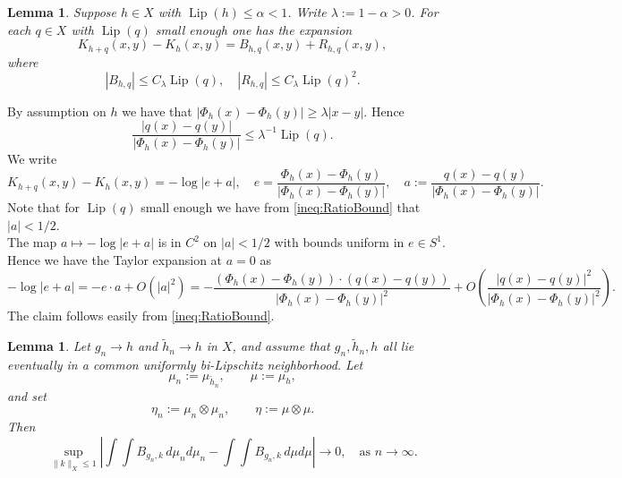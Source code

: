 \documentclass[11pt]{article}
\theoremstyle{plain}
\numberwithin{equation}{section}
\newtheorem{lemma}[theorem]{Lemma}
\theoremstyle{definition}
\let\oldendproof\endproof
\renewenvironment{proof}[1][\proofname]{%
\oldproof[\upshape \bfseries #1]%
}{\oldendproof}
\DeclareMathOperator{\Lip}{Lip}
\begin{document}
    \begin{lemma}
        \label{lem:KernelExpansion}
        Suppose $h \in X$ with $\Lip(h)\leq \alpha <1$. Write $\lambda:=1-\alpha >0$. For each $q \in X$ with $\Lip(q)$ small enough one has the expansion
        \[
        K_{h+q}(x,y)-K_h(x,y)=B_{h,q}(x,y)+R_{h,q}(x,y),
        \]
        where
        \[
        |B_{h,q}|\leq C_\lambda \Lip(q),\quad |R_{h,q}|\leq C_\lambda\Lip(q)^2.
        \]
    \end{lemma}

    \begin{proof}
        By assumption on $h$ we have that $|\Phi_h(x)-\Phi_h(y)|\geq \lambda|x-y|$. Hence
        \begin{equation}
            \label{ineq:RatioBound}
            \frac{|q(x)-q(y)|}{|\Phi_h(x)-\Phi_h(y)|}\leq \lambda^{-1}\Lip(q).
        \end{equation}
        We write
        \[
        K_{h+q}(x,y)-K_h(x,y)=-\log|e+a|,\quad e=\frac{\Phi_h(x)-\Phi_h(y)}{|\Phi_h(x)-\Phi_h(y)|},\quad a:=\frac{q(x)-q(y)}{|\Phi_h(x)-\Phi_h(y)|}.
        \]
        Note that for $\Lip(q)$ small enough we have from \eqref{ineq:RatioBound} that $|a|<1/2$.\\
        The map $a\mapsto -\log|e+a|$ is in $C^2$ on $|a|<1/2$ with bounds uniform in $e \in S^1$. Hence we have the Taylor expansion at $a=0$ as
        \[
        -\log|e+a|=-e\cdot a+O(|a|^2)=-\frac{(\Phi_h(x)-\Phi_h(y))\cdot(q(x)-q(y))}{|\Phi_h(x)-\Phi_h(y)|^2}+O\left(\frac{|q(x)-q(y)|^2}{|\Phi_h(x)-\Phi_h(y)|^2}\right).
        \]
        The claim follows easily from \eqref{ineq:RatioBound}.
    \end{proof}

    \begin{lemma}
    \label{lem:MovingConvergence}
    Let $g_n\to h$ and $\tilde h_n\to h$ in $X$, and assume that $g_n,\tilde h_n,h$ all lie eventually in a common uniformly bi-Lipschitz neighborhood. Let
    \[
        \mu_n:=\mu_{\tilde h_n},\qquad \mu:=\mu_h,
    \]
    and set
    \[
        \eta_n:=\mu_n\otimes\mu_n,\qquad \eta:=\mu\otimes\mu.
    \]
    Then
    \begin{equation*}
        \sup_{\|k\|_X\leq 1}
        \left|
            \int\int B_{g_n,k}\,d\mu_n d\mu_n
            -
            \int\int B_{g_n,k}\,d\mu d\mu
        \right|
        \to 0,\quad \text{as }n \to \infty.
    \end{equation*}
\end{lemma}
\end{document}
